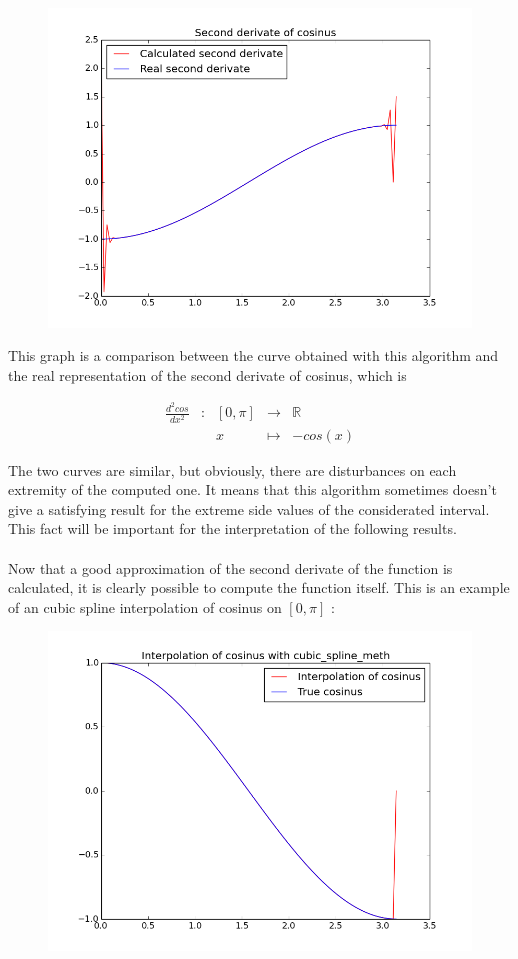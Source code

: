 \documentclass{article}
\begin{document}
\begin{figure}[h]
  \includegraphics[width=12cm]{cosinus_second_derivate}
\end{figure}

This graph is a comparison between the curve obtained with this algorithm and the real representation of the second derivate of cosinus, which is

\begin{equation}
\begin{array}{ccccl}
\frac{d^2 cos}{dx^2} & : & [0, \pi] & \to & \mathbb{R} \\
 & & x & \mapsto & -cos(x)
\end{array}
\end{equation}

The two curves are similar, but obviously, there are disturbances on each extremity of the computed one. It means that this algorithm sometimes doesn't give a satisfying result for the extreme side values of the considerated interval. This fact will be important for the interpretation of the following results.\\\\

Now that a good approximation of the second derivate of the function is calculated, it is clearly possible to compute the function itself. This is an example of an cubic spline interpolation of cosinus on $[0, \pi]$ :

\begin{figure}[h]
  \includegraphics[width=12cm]{cosinus_interpolation}
\end{figure}
\end{document}
